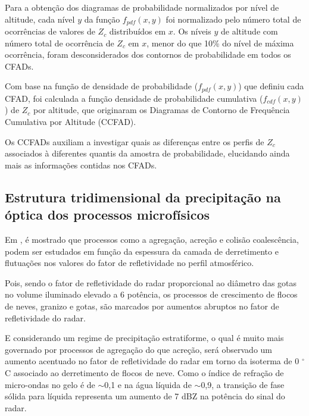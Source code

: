 

Para a obtenção dos diagramas de probabilidade normalizados por nível de altitude, cada nível $y$ da função $f_{pdf}(x,y)$ foi normalizado pelo número total de ocorrências de valores de $Z_c$ distribuídos em $x$. Os níveis $y$ de altitude com número total de ocorrência de $Z_c$ em $x$, menor do que 10\% do nível de máxima ocorrência, foram desconsiderados dos contornos de probabilidade em todos os CFADs.

Com base na função de densidade de probabilidade ($f_{pdf}(x,y)$) que definiu cada CFAD, foi calculada a função densidade de probabilidade cumulativa ($f_{cdf}(x,y)$) de $Z_c$ por altitude, que originaram os Diagramas de Contorno de Frequência Cumulativa por Altitude (CCFAD).     



Os CCFADs auxiliam a investigar quais as diferenças entre os perfis de $Z_c$ associados à diferentes quantis da amostra de probabilidade, elucidando ainda mais as informações contidas nos CFADs.


\subsection{Estrutura tridimensional da precipitação na óptica dos processos microfísicos}

\label{chuvaEtemperatura}


Em , é mostrado que processos como a agregação, acreção e colisão coalescência, podem ser estudados em função da espessura da camada de derretimento e flutuações nos valores do fator de refletividade no perfil atmosférico. 

Pois, sendo o fator de refletividade do radar proporcional ao diâmetro das gotas no volume iluminado elevado a 6 potência, os processos de crescimento de flocos de neves, granizo e gotas, são marcados por aumentos abruptos no fator de refletividade do radar. 

E considerando um regime de precipitação estratiforme, o qual é muito mais governado por processos de agregação do que acreção, será observado um aumento acentuado no fator de refletividade do radar em torno da isoterma de 0 $^{\circ}$C associado ao derretimento de flocos de neve.  Como o índice de refração de micro-ondas no gelo é de $\sim$0,1 e na água líquida de $\sim$0,9, a transição de fase sólida para líquida representa um aumento de 7 dBZ na potência do sinal do radar.


